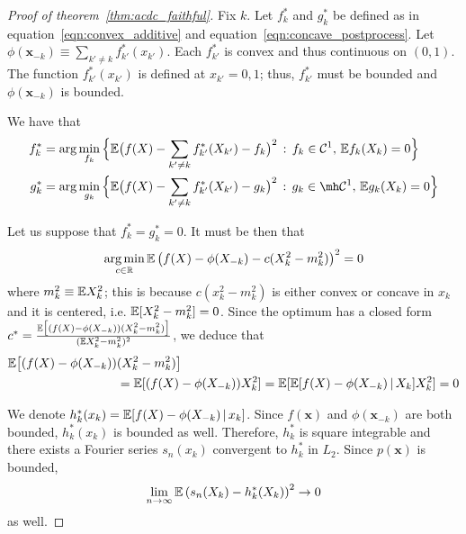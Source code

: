 \begin{proof}[Proof of theorem~\ref{thm:acdc_faithful}]

Fix $k$. Let $f^*_k$ and $g^*_k$ be defined as in
equation~\ref{eqn:convex_additive} and
equation~\ref{eqn:concave_postprocess}. Let $\phi(\mathbf{x}_{-k})
\equiv \sum_{k' \neq k} f^*_{k'}(x_{k'})$. Each $f^*_{k'}$ is convex
and thus continuous on $(0,1)$. The function $f^*_{k'}(x_{k'})$ is defined at
$x_{k'} = 0,1$; thus, $f^*_{k'}$ must be bounded and
$\phi(\mathbf{x}_{-k})$ is bounded.

We have that
\begin{align}
f^*_k &= \arg\min_{f_k} \Big\{
   \E\big( f(X) - \sum_{k' \neq k} f^*_{k'}(X_{k'}) - f_k \big)^2 
    \,:\, f_k \in  \mathcal{C}^1,\, \E f_k(X_k) = 0 
  \Big\} \\
g^*_k &= \arg\min_{g_k} \Big\{
   \E\big( f(X) - \sum_{k' \neq k} f^*_{k'}(X_{k'}) - g_k \big)^2 
    \,:\, g_k \in \mh \mathcal{C}^1,\, \E g_k(X_k) = 0 
  \Big\}
\end{align}

Let us suppose that $f^*_k = g^*_k = 0$. It must be then that
\begin{align*}
\mathop{\text{\rm arg\,min}}_{c \in {\mathbb R}} {\mathbb E} \left( f(X) - \phi(X_{-k}) - c (X_k^2 - m_k^2) \right)^2 = 0
\end{align*}
where $m_k^2 \equiv {\mathbb E} X_k^2$; this is because $c(x_k^2 - m_k^2)$ is either convex or concave in $x_k$ and it is centered, i.e. ${\mathbb E}[ X_k^2 - m_k^2] = 0$. Since the optimum has a closed form $c^* = \frac{{\mathbb E}\big[(f(X) -\phi(X_{-k}))(X_k^2 - m^2_k)\big]}{({\mathbb E} X_k^2 - m^2_k)^2}$, we deduce that 
\begin{align*}
{\mathbb E} \big[ (f(X) - \phi(X_{-k})) &(X_k^2 - m_k^2) \big] \\
   &= {\mathbb E}[ (f(X) - \phi(X_{-k})) X^2_k] = 
 {\mathbb E}[ {\mathbb E}[ f(X) - \phi(X_{-k}) {\,|\,} X_k] X^2_k] = 0
\end{align*}

We denote $h^*_k(x_k) = {\mathbb E}[ f(X) - \phi(X_{-k}) {\,|\,}
  x_k]$.  Since $f(\mathbf{x})$ and $\phi(\mathbf{x}_{-k})$ are both bounded,
$h^*_k(x_k)$ is bounded as well. Therefore, $h^*_k$ is square
integrable and there exists a Fourier series $s_n(x_k)$ convergent to
$h^*_k$ in $L_2$. Since $p(\mathbf{x})$ is bounded, $$\lim_{n
  \rightarrow \infty} {\mathbb E} \left( s_n(X_k) - h^*_k(X_k ) \right)^2
\rightarrow 0$$ as well.



\end{proof}
